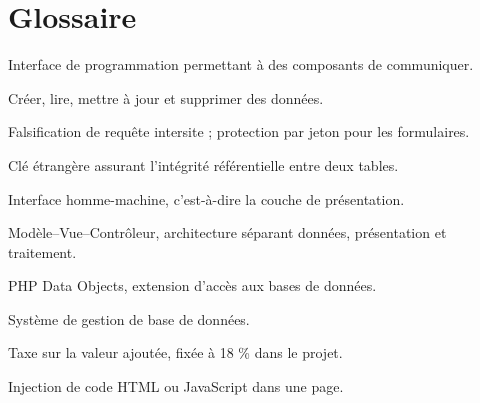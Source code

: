 \section*{Glossaire}

\begin{description}[leftmargin=3.2cm,style=nextline]
  \item[API] Interface de programmation permettant à des composants de communiquer.
  \item[CRUD] Créer, lire, mettre à jour et supprimer des données.
  \item[CSRF] Falsification de requête intersite ; protection par jeton pour les formulaires.
  \item[FK] Clé étrangère assurant l'intégrité référentielle entre deux tables.
  \item[IHM] Interface homme-machine, c'est-à-dire la couche de présentation.
  \item[MVC] Modèle--Vue--Contrôleur, architecture séparant données, présentation et traitement.
  \item[PDO] PHP Data Objects, extension d'accès aux bases de données.
  \item[SGBD] Système de gestion de base de données.
  \item[TVA] Taxe sur la valeur ajoutée, fixée à 18 \% dans le projet.
  \item[XSS] Injection de code HTML ou JavaScript dans une page.
\end{description}
